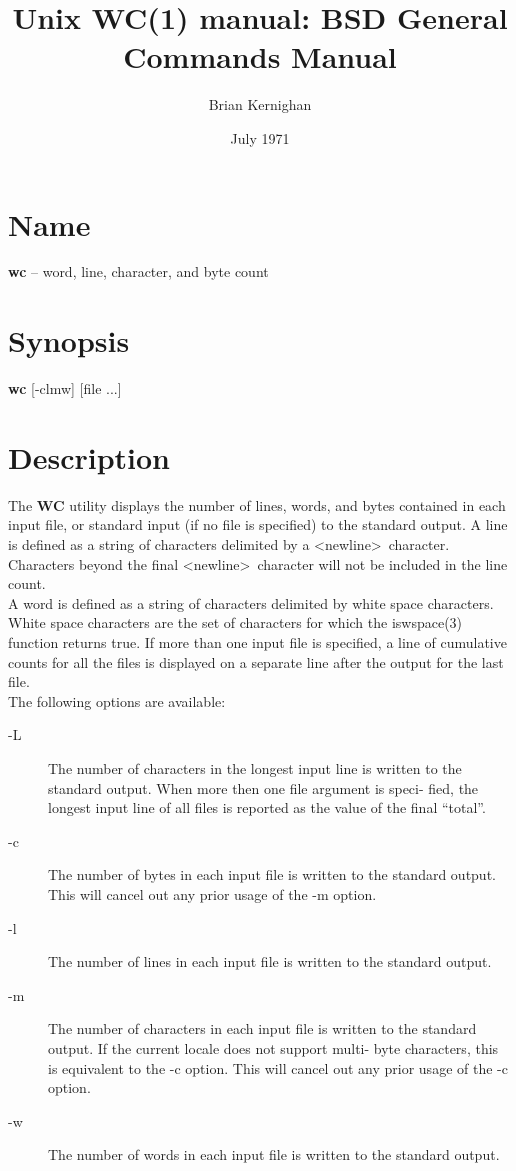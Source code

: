 \documentclass{article}
\title{Unix \textbf{WC(1)} manual: BSD General Commands Manual}
\author{Brian Kernighan}
\date{July 1971}
\begin{document}
\maketitle

\section{Name}
\textbf{wc} -- word, line, character, and byte count

\section{Synopsis}
\textbf{wc} [-clmw] [file ...]

\section{Description}
The \textbf{WC} utility displays the number of lines, words, and bytes contained
in each input file, or standard input (if no file is specified) to the
standard output.  A line is defined as a string of characters delimited
by a \textless newline\textgreater \ character.  Characters beyond the final  
\textless newline\textgreater \ character will not be included in the line count.\\

A word is defined as a string of characters delimited by white space
characters.  White space characters are the set of characters for which
the iswspace(3) function returns true.  If more than one input file is
specified, a line of cumulative counts for all the files is displayed on
a separate line after the output for the last file.\\

The following options are available:

\begin{description}
  	\item[-L] The number	of characters in the longest input line	is written to
	     the standard output.  When	more then one file argument is speci-
	     fied, the longest input line of all files is reported as the
	     value of the final	``total''.
  	\item[-c]	     The number	of bytes in each input file is written to the standard
	     output.  This will	cancel out any prior usage of the -m option.
  	\item[-l]	     The number	of lines in each input file is written to the standard
	     output.
	\item[-m]	     The number	of characters in each input file is written to the
	     standard output.  If the current locale does not support multi-
	     byte characters, this is equivalent to the	-c option.  This will
	     cancel out	any prior usage	of the -c option.
	\item[-w]	     The number	of words in each input file is written to the standard
	     output.
\end{description}
\end{document}
